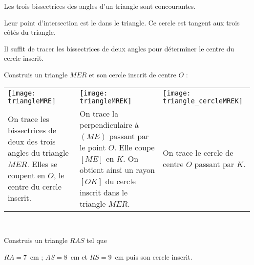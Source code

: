  \begin{methode*1}
 
\begin{aconnaitre}
Les trois bissectrices des angles d'un triangle sont concourantes. 

Leur point d'intersection est le  dans le triangle. Ce cercle est tangent aux trois côtés du triangle.
 \end{aconnaitre}
 
 \begin{remarque}
Il suffit de tracer les bissectrices de deux angles pour déterminer le centre du cercle inscrit.
 \end{remarque}
 
 \begin{exemple*1}
 Construis un triangle $MER$ et son cercle inscrit de centre $O$ :
 \begin{tabularx}{\textwidth}{X|X|X}
 \texttt{[image: triangleMRE]} &  \texttt{[image: triangleMREK]} & \texttt{[image: triangle\_cercleMREK]} \\ 
 On trace les bissectrices de deux des trois angles du triangle $MER$. Elles se coupent en $O$, le centre du cercle inscrit. & On trace la perpendiculaire à $(ME)$ passant par le point $O$. Elle coupe $[ME]$ en $K$. On obtient ainsi un rayon $[OK]$ du cercle inscrit dans le triangle $MER$. & On trace le cercle de centre $O$ passant par $K$. \\
 \end{tabularx} \\

\end{exemple*1}
 
 \exercice
Construis un triangle $RAS$ tel que 

$RA = 7$ cm ; $AS = 8$ cm et $RS = 9$ cm puis son cercle inscrit.
 
 \end{methode*1}

